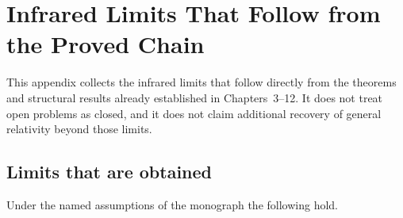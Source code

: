 \chapter{Infrared Limits That Follow from the Proved Chain}
\label{app:gr_recovery}

This appendix collects the infrared limits that follow directly from
the theorems and structural results already established in
Chapters~3--12. It does not treat open problems as closed, and it
does not claim additional recovery of general relativity beyond
those limits.

\section{Limits that are obtained}
\label{sec:recovery-obtained}

Under the named assumptions of the monograph the following hold.

